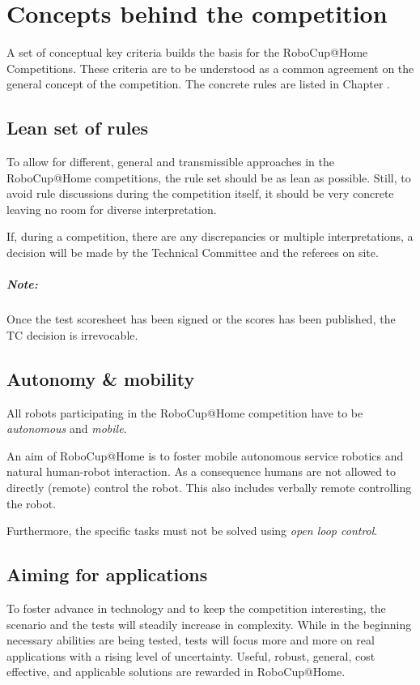 \chapter{Concepts behind the competition}
\label{chap:concepts}
A set of conceptual key criteria builds the basis for the RoboCup@Home Competitions. These
criteria are to be understood as a common agreement on the general concept of the competition.
The concrete rules are listed in Chapter .

\section{Lean set of rules}
\label{concept:lean_set_of_rules}
To allow for different, general and transmissible approaches in the RoboCup@Home competitions, the rule set should be as lean as possible. Still, to avoid rule discussions during the competition itself, it should be very concrete leaving no room for diverse interpretation.

If, during a competition, there are any discrepancies or multiple interpretations, a decision will be made by the Technical Committee and the referees on site.

\paragraph*{Note: } Once the test scoresheet has been signed or the scores has been published, the TC decision is irrevocable.

\section{Autonomy \& mobility}
\label{concept:autonomy_and_mobility}
All robots participating in the RoboCup@Home competition have to be \emph{autonomous} and \emph{mobile}.

An aim of RoboCup@Home is to foster mobile autonomous service robotics and natural human-robot interaction. As a consequence humans are not allowed to directly (remote) control the robot. This also includes verbally remote controlling the robot.

Furthermore, the specific tasks must not be solved using \emph{open loop control}.

\section{Aiming for applications}
\label{concept:aiming_for_applications}
To foster advance in technology and to keep the competition interesting, the scenario and the tests will steadily increase in complexity. While in the beginning necessary abilities are being tested, tests will focus more and more on real applications with a rising level of uncertainty. Useful, robust, general, cost effective, and applicable solutions are rewarded in RoboCup@Home.

